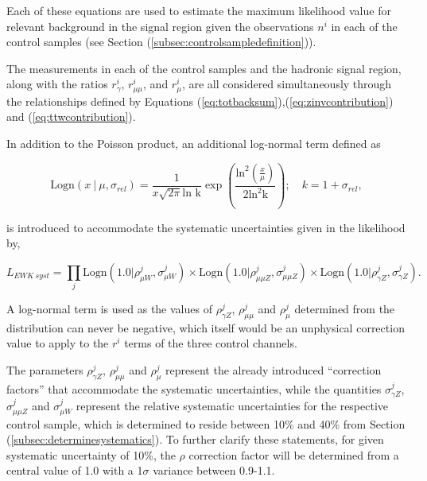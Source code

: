 Each of these equations are used to estimate the maximum likelihood value for relevant background in the signal region given the observations $n^{i}$ in each of the control samples (see Section (\ref{subsec:controlsampledefinition})).

The measurements in each of the control samples and the hadronic signal region, along with the ratios $r^{i}_{\gamma}$, $r^{i}_{\mu\mu}$, and $r^{i}_{\mu}$, are all considered simultaneously through the relationships defined by Equations (\ref{eq:totbacksum}),(\ref{eq:zinvcontribution}) and (\ref{eq:ttwcontribution}).

In addition to the Poisson product, an additional log-normal term \cite{logndistribution} defined as

\begin{equation}
\text{Logn}(x\ |\ \xspace \mu, \sigma_{rel}) = \frac{1}{x\sqrt{2\pi}\text{ln k}}\exp\left(\frac{\text{ln}^{2}(\frac{x}{\mu})}{2\text{ln}^{2}\text{k}}\right); \quad k = 1 + \sigma_{rel},
\end{equation}

is introduced to accommodate the systematic uncertainties given in the likelihood by,

\begin{equation}
L_{EWK\ syst} = \prod_{j} \text{Logn}(1.0|\rho^{j}_{\mu W},\sigma^{j}_{\mu W} ) \times \text{Logn}(1.0|\rho^{j}_{\mu\mu Z},\sigma^{j}_{\mu\mu Z} ) \times \text{Logn}(1.0|\rho^{j}_{\gamma Z},\sigma^{j}_{\gamma Z} ).
\end{equation}

A log-normal term is used as the values of $\rho^{j}_{\gamma Z}$, $\rho^{j}_{\mu\mu}$ and $\rho^{j}_{\mu}$ determined from the distribution can never be negative, which itself would be an unphysical correction value to apply to the $r^{i}$ terms of the three control channels. 

The parameters $\rho^{j}_{\gamma Z}$, $\rho^{j}_{\mu\mu}$ and $\rho^{j}_{\mu}$ represent the already introduced ``correction factors'' that accommodate the systematic uncertainties, while the quantities $\sigma^{j}_{\gamma Z}$, $\sigma^{j}_{\mu\mu Z}$ and $\sigma^{j}_{\mu W}$ represent the relative systematic uncertainties for the respective control sample, which is determined to reside between 10\% and 40\% from Section (\ref{subsec:determinesystematics}). To further clarify these statements, for given systematic uncertainty of 10\%, the $\rho$ correction factor will be determined from a central value of 1.0 with a 1$\sigma$ variance between 0.9-1.1. 

